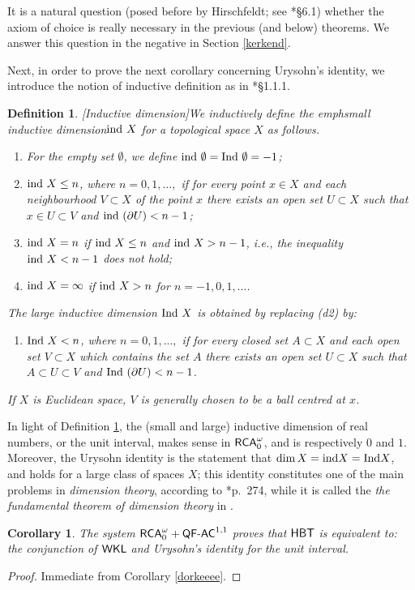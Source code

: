 \documentclass[reqno]{amsart}
\newtheorem{cor}[thm]{Corollary}
\newtheorem{defi}[thm]{Definition}
\def\bdefi{\begin{defi}\rm}
\def\edefi{\end{defi}}
\def\RCAo{\textup{\textsf{RCA}}_{0}^{\omega}}
\def\WKL{\textup{\textsf{WKL}}}
\def\ind{\textup{{ind }}}
\def\Ind{\textup{{Ind }}}
\def\QFAC{\textup{\textsf{QF-AC}}}
\def\HBT{\textup{\textsf{HBT}}}
\numberwithin{equation}{section}
\numberwithin{thm}{section}
\begin{document}
\smallskip

It is a natural question (posed before by Hirschfeldt; see \cite{montahue}*{\S6.1}) whether the axiom of choice is really necessary in the previous (and below) theorems.  
We answer this question in the negative in Section \ref{kerkend}.

\smallskip

%
%
Next, in order to prove the next corollary concerning Urysohn's identity, we introduce the notion of inductive definition as in \cite{engeltjemijn}*{\S1.1.1}.
\bdefi[Inductive dimension]\label{roolin} We inductively define the emph{small inductive dimension}$ \ind X$ for a topological space $X$ as follows. 
\begin{enumerate}
\item[(d1)] For the empty set $\emptyset$, we define ${\textup{ind }} \emptyset={\textup{Ind }}\emptyset=-1$;
\item[(d2)] $\ind X\leq n$, where $n = 0,1,\dots,$ if for every point $x \in X$ and each neighbourhood $V \subset X$ of the point $x$ there exists an open set $U \subset X$ such that $x\in U\subset V$ and $\ind (\partial U)<n-1$;
\item[(d3)]  $\ind X = n$ if $\ind X \leq n$ and $\ind X > n- 1$, i.e., the inequality $\ind X <n- 1$ does not hold;
\item[(d4)] $\ind X= \infty$ if $\ind X>n$ for $n=-1,0,1,...$.  %
\end{enumerate}
The \emph{large inductive dimension} $\Ind X$ is obtained by replacing (d2) by:
\begin{enumerate}
\item[(d$2^{*}$)] $\Ind X<n$, where $n=0,1,...,$ if for every closed set $A\subset X$ and
each open set $V \subset X$ which contains the set $A$ there exists an open set $U \subset X$ such that $A\subset U \subset V$ and $\Ind (\partial U)< n-1$.
\end{enumerate}
If $X$ is Euclidean space, $V$ is generally chosen to be a ball centred at $x$.
\edefi 
In light of Definition \ref{roolin}, the (small and large) inductive dimension of real numbers, or the unit interval, makes sense in $\RCAo$, and is respectively $0$ and $1$.  
Moreover, the Urysohn identity is the statement that $\dim X=\textup{ind} X=\textup{Ind} X$, and holds for a large class of spaces $X$; this identity constitutes one of the main problems in \emph{dimension theory}, according to \cite{enc2}*{p.\ 274}, while it is called the \emph{the fundamental theorem of dimension theory} in \cite{engeltjemijn}.
\begin{cor}\label{hoerke}
The system $\RCAo+\QFAC^{1,1}$ proves that $\HBT$ is equivalent to: the conjunction of  $\WKL$ and Urysohn's identity for the unit interval.
\end{cor}
\begin{proof}
Immediate from Corollary \ref{dorkeeee}.
\end{proof}
\end{document}
